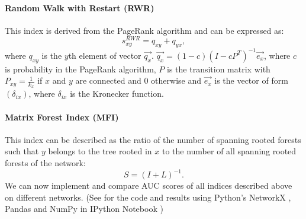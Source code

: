 \documentclass{llncs}
\begin{document}
\paragraph{Random Walk with Restart (RWR)}
%
This index is derived from the PageRank algorithm and can be expressed as:
\begin{equation}
s_{xy}^{RWR} = q_{xy} + q_{yx},
\end{equation}
where $q_{xy}$ is the $y$th element of vector $\overrightarrow{q_x}$. $\overrightarrow{q_x} = (1 - c)(I - cP^{T})^{-1} \overrightarrow{e_x}$, where $c$ is probability in the PageRank algorithm, $P$ is the transition matrix with $P_{xy} = \frac{1}{k_x}$ if $x$ and $y$ are connected and $0$ otherwise and $\overrightarrow{e_x}$ is the vector of form $(\delta_{ix})$, where $\delta_{ix}$ is the Kronecker function. 
%
\paragraph{Matrix Forest Index (MFI) \cite{mf-index}}
%
This index can be described as the ratio of the number of spanning rooted forests such that $y$ belongs to the tree rooted in $x$ to the number of all spanning rooted forests of the network:
\begin{equation}
S = (I + L)^{-1}.
\end{equation}
%
We can now implement and compare AUC scores of all indices described above on different networks. (See \cite{ipynb-auc} for the code and results using Python's NetworkX \cite{networkx}, Pandas \cite{pandas} and NumPy \cite{numpy} in IPython Notebook \cite{ipython})
%
\setlength{\tabcolsep}{5pt}
\renewcommand{\arraystretch}{1.5}
\end{document}
